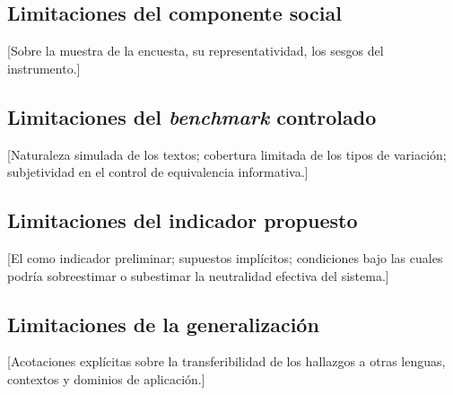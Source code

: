 \subsection{Limitaciones del componente social}

[Sobre la muestra de la encuesta, su representatividad, los sesgos del
instrumento.]

\subsection{Limitaciones del \textit{benchmark} controlado}

[Naturaleza simulada de los textos; cobertura limitada de los tipos de
variación; subjetividad en el control de equivalencia informativa.]

\subsection{Limitaciones del indicador propuesto}

[El \INS como indicador preliminar; supuestos implícitos; condiciones bajo
las cuales podría sobreestimar o subestimar la neutralidad efectiva del
sistema.]

\subsection{Limitaciones de la generalización}

[Acotaciones explícitas sobre la transferibilidad de los hallazgos a otras
lenguas, contextos y dominios de aplicación.]

